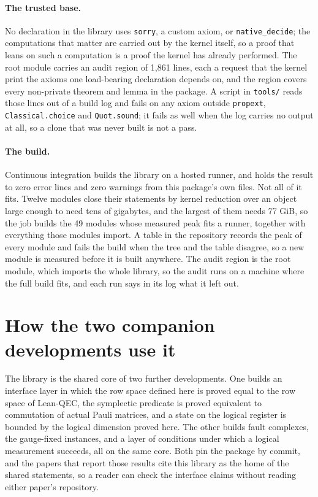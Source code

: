 \documentclass[11pt]{article}
\newcommand{\package}[1]{\texttt{#1}}
\begin{document}
\paragraph{The trusted base.} No declaration in the library uses \package{sorry}, a custom
axiom, or \package{native\_decide}; the computations that matter are carried out by the
kernel itself, so a proof that leans on such a computation is a proof the kernel has
already performed. The root module carries an audit region of 1{,}861 lines, each a
request that the kernel print the axioms one load-bearing declaration depends on, and the
region covers every non-private theorem and lemma in the package. A script in
\package{tools/} reads those lines out of a build log and fails on any axiom outside
\package{propext}, \package{Classical.choice} and \package{Quot.sound}; it fails as well
when the log carries no output at all, so a clone that was never built is not a pass.

\paragraph{The build.} Continuous integration builds the library on a hosted runner, and
holds the result to zero error lines and zero warnings from this package's own files. Not
all of it fits. Twelve modules close their statements by kernel reduction over an object
large enough to need tens of gigabytes, and the largest of them needs 77 GiB, so the job
builds the 49 modules whose measured peak fits a runner, together with everything those
modules import. A table in the repository records the peak of every module and fails the
build when the tree and the table disagree, so a new module is measured before it is built
anywhere. The audit region is the root module, which imports the whole library, so the
audit runs on a machine where the full build fits, and each run says in its log what it
left out.

\section{How the two companion developments use it}

The library is the shared core of two further developments. One builds an interface layer
in which the row space defined here is proved equal to the row space of Lean-QEC, the
symplectic predicate is proved equivalent to commutation of actual Pauli matrices, and a
state on the logical register is bounded by the logical dimension proved here. The other
builds fault complexes, the gauge-fixed instances, and a layer of conditions under which a
logical measurement succeeds, all on the same core. Both pin the package by commit, and
the papers that report those results cite this library as the home of the shared
statements, so a reader can check the interface claims without reading either paper's
repository.
\end{document}
